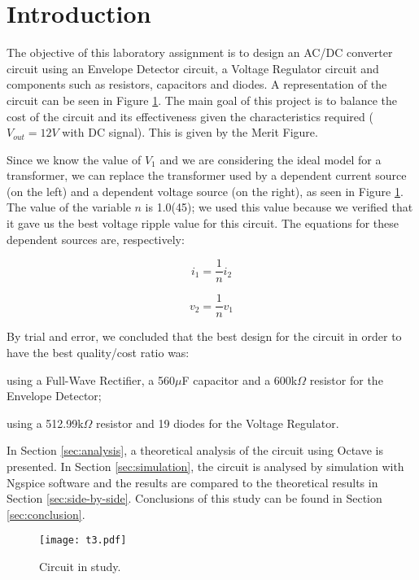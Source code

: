 \section{Introduction}
\label{sec:introduction}

The objective of this laboratory assignment is to design an AC/DC converter circuit using an Envelope Detector circuit, a Voltage Regulator circuit and components such as resistors, capacitors and diodes. A representation of the circuit can be seen in Figure \ref{fig:t3}. 
The main goal of this project is to balance the cost of the circuit and its effectiveness given the characteristics required ($V_{out}=12V$ with DC signal). This is given by the Merit Figure. \par
Since we know the value of $V_1$ and we are considering the ideal model for a transformer, we can replace the transformer used by a dependent current source (on the left) and a dependent voltage source (on the right), as seen in Figure \ref{fig:t3}. The value of the variable $n$ is 1.0(45); we used this value because we verified that it gave us the best voltage ripple value for this circuit. The equations for these dependent sources are, respectively:

\begin{equation}
  i_1=\frac{1}{n}i_2
  \label{eq:kvl1}
\end{equation} 

\begin{equation}
  v_2=\frac{1}{n}v_1
  \label{eq:kvl2}
\end{equation} 

By trial and error, we concluded that the best design for the circuit in order to have the best quality/cost ratio was:\par
\quad using a Full-Wave Rectifier, a 560$\mu$F capacitor and a 600k$\Omega$ resistor for the Envelope Detector;\par
\quad using a 512.99k$\Omega$ resistor and 19 diodes for the Voltage Regulator.

In Section \ref{sec:analysis}, a theoretical analysis of the circuit using Octave is
presented. In Section \ref{sec:simulation}, the circuit is analysed by
simulation with Ngspice software and the results are compared to the theoretical results in Section \ref{sec:side-by-side}. Conclusions of this study can be found in
Section \ref{sec:conclusion}.

\begin{figure}[htp] \centering
\texttt{[image: t3.pdf]}
\caption{Circuit in study.}
\label{fig:t3}
\end{figure}
\FloatBarrier

